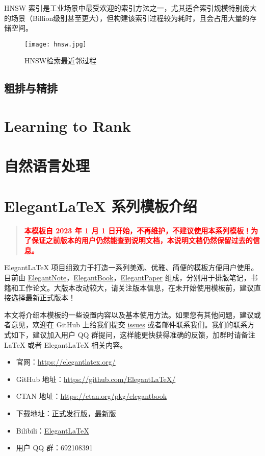 \documentclass[lang=cn,newtx,10pt,scheme=chinese,color=black]{elegantbook}
\begin{document}
HNSW 索引是工业场景中最受欢迎的索引方法之一，尤其适合索引规模特别庞大的场景（Billion级别甚至更大），但构建该索引过程较为耗时，且会占用大量的存储空间。

\begin{figure}[htbp]
  \centering
  \texttt{[image: hnsw.jpg]}
  \caption{HNSW检索最近邻过程 \label{fig:hnsw}}
\end{figure}


\section{粗排与精排}


\chapter{Learning to Rank}

\chapter{自然语言处理}


\chapter{Elegant\LaTeX{} 系列模板介绍}

\begin{quotation}
  \textbf{\textcolor{red}{本模板自 2023 年 1 月 1 日开始，不再维护，不建议使用本系列模板！为了保证之前版本的用户仍然能查到说明文档，本说明文档仍然保留过去的信息。}}
\end{quotation}

Elegant\LaTeX{} 项目组致力于打造一系列美观、优雅、简便的模板方便用户使用。目前由 \href{https://github.com/ElegantLaTeX/ElegantNote}{ElegantNote}，\href{https://github.com/ElegantLaTeX/ElegantBook}{ElegantBook}，\href{https://github.com/ElegantLaTeX/ElegantPaper}{ElegantPaper} 组成，分别用于排版笔记，书籍和工作论文。大版本改动较大，请关注版本信息，在未开始使用模板前，建议直接选择最新正式版本！


本文将介绍本模板的一些设置内容以及基本使用方法。如果您有其他问题，建议或者意见，欢迎在 GitHub 上给我们提交 \href{https://github.com/ElegantLaTeX/ElegantBook/issues}{issues} 或者邮件联系我们。我们的联系方式如下，建议加入用户 QQ 群提问，这样能更快获得准确的反馈，加群时请备注 \LaTeX{} 或者 Elegant\LaTeX{} 相关内容。
\begin{itemize}
  \item 官网：\href{https://elegantlatex.org/}{https://elegantlatex.org/}
  \item GitHub 地址：\href{https://github.com/ElegantLaTeX/}{https://github.com/ElegantLaTeX/}
  \item CTAN 地址：\href{https://ctan.org/pkg/elegantbook}{https://ctan.org/pkg/elegantbook}
  \item 下载地址：\href{https://github.com/ElegantLaTeX/ElegantBook/releases}{正式发行版}，\href{https://github.com/ElegantLaTeX/ElegantBook/archive/master.zip}{最新版}
  \item Bilibili：\href{https://space.bilibili.com/516479629}{ElegantLaTeX}
  \item 用户 QQ 群：692108391
\end{itemize}
\end{document}
